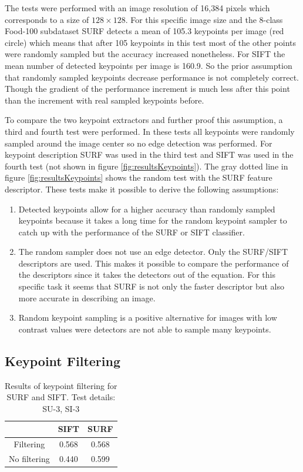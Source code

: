 	The tests were performed with an image resolution of 16,384 pixels which corresponds to a size of $128 \times 128$. For this specific image size and the 8-class Food-100 subdataset SURF detects a mean of 105.3 keypoints per image {(red circle)} which means that after 105 keypoints in this test most of the other points were randomly sampled but the accuracy increased nonetheless. For SIFT the mean number of detected keypoints per image is 160.9. So the prior assumption that randomly sampled keypoints decrease performance is not completely correct. Though the gradient of the performance increment is much less after this point than the increment with real sampled keypoints before.
	
	To compare the two keypoint extractors and further proof this assumption, a third and fourth test were performed. In these tests all keypoints were randomly sampled around the image center so no edge detection was performed. For keypoint description SURF was used in the third test and SIFT was used in the fourth test {(not shown in figure \ref{fig:resultsKeypoints})}. The gray dotted line in figure \ref{fig:resultsKeypoints} shows the random test with the SURF feature descriptor. These tests make it possible to derive the following assumptions:
	
	\begin{enumerate}
		\item Detected keypoints allow for a higher accuracy than randomly sampled keypoints because it takes a long time for the random keypoint sampler to catch up with the performance of the SURF or SIFT classifier.
		\item The random sampler does not use an edge detector. Only the SURF/SIFT descriptors are used. This makes it possible to compare the performance of the descriptors since it takes the detectors out of the equation. For this specific task it seems that SURF is not only the faster descriptor but also more accurate in describing an image.
		\item Random keypoint sampling is a positive alternative for images with low contrast values were detectors are not able to sample many keypoints.
	\end{enumerate} 
	
		
	\subsection{Keypoint Filtering}
		\begin{table}[htb]
			\centering
			\begin{tabular}{@{}ccc@{}}
				\toprule
							 & SIFT  & SURF  \\ \midrule
				Filtering    & 0.568 & 0.568 \\
				No filtering & 0.440 & 0.599 \\ \bottomrule
			\end{tabular}
			\caption{Results of keypoint filtering for SURF and SIFT. Test details: SU-3, SI-3}
			\label{tab:resultFiltering}
		\end{table}
	
